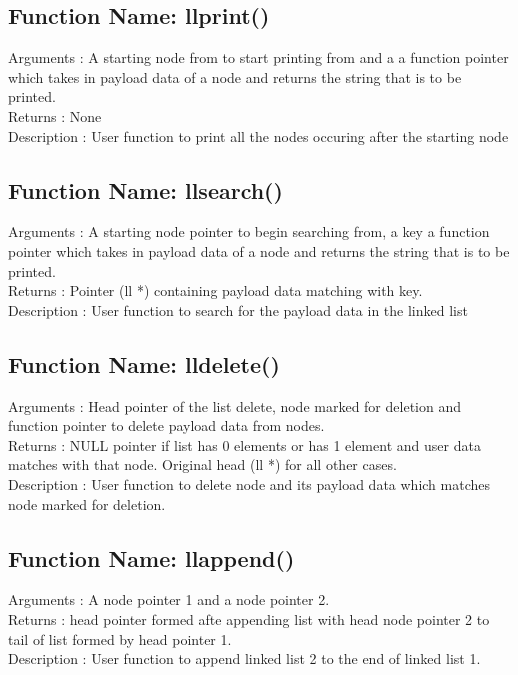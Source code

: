 \documentclass{article}
\begin{document}
  \subsection{Function Name: llprint()}
  Arguments    : A starting node from to start printing from and a
  a function pointer which takes in payload data of a
  node and returns the string that is to be printed. \\
  Returns      : None \\
  Description  : User function to print all the nodes occuring after
  the starting node \\

  \subsection{ Function Name: llsearch()}
  Arguments    : A starting node pointer to begin searching from, a
  key a function pointer which takes in payload data 
  of a node and returns the string that is to be
  printed.\\
  Returns      : Pointer (ll *) containing payload data matching with
  key.\\
  Description  : User function to search for the payload data in the
  linked list\\

  \subsection{ Function Name: lldelete()}
  Arguments    : Head pointer of the list delete, node marked for
  deletion and function pointer to delete payload data
  from nodes. \\
  Returns      : NULL pointer if list has 0 elements or has 1 element
  and user data matches with that node. Original head (ll *)
  for all other cases. \\
  Description  : User function to delete node and its payload data
  which matches node marked for deletion. \\

  \subsection{ Function Name: llappend()}
  Arguments    : A node pointer 1 and a node pointer 2. \\
  Returns      : head pointer formed afte appending list with
  head node pointer 2 to tail of list formed by head
  pointer 1. \\
  Description  : User function to append linked list 2 to the end of
  linked list 1. \\

  
 
\end{document}
